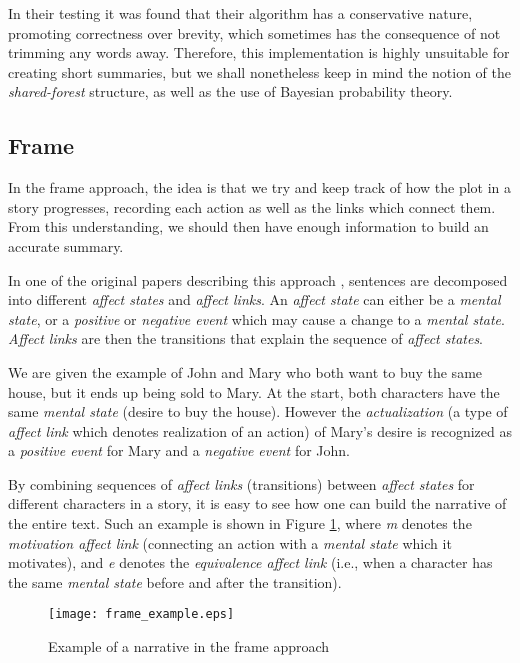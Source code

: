 In their testing it was found that their algorithm has a conservative nature, promoting correctness over brevity, which sometimes has the consequence of not trimming any words away. Therefore, this implementation is highly unsuitable for creating short summaries, but we shall nonetheless keep in mind the notion of the \textit{shared-forest} structure, as well as the use of Bayesian probability theory.

\subsection{Frame}

In the frame approach, the idea is that we try and keep track of how the plot in a story progresses, recording each action as well as the links which connect them. From this understanding, we should then have enough information to build an accurate summary.

\mbox{}

In one of the original papers describing this approach \cite{lehnert_1980_nodate}, sentences are decomposed into different \textit{affect states} and \textit{affect links}. An \textit{affect state} can either be a \textit{mental state}, or a \textit{positive} or \textit{negative event} which may cause a change to a \textit{mental state}. \textit{Affect links} are then the transitions that explain the sequence of \textit{affect states}.

We are given the example of John and Mary who both want to buy the same house, but it ends up being sold to Mary. At the start, both characters have the same \textit{mental state} (desire to buy the house). However the \textit{actualization} (a type of \textit{affect link} which denotes realization of an action) of Mary's desire is recognized as a \textit{positive event} for Mary and a \textit{negative event} for John.

By combining sequences of \textit{affect links} (transitions) between \textit{affect states} for different characters in a story, it is easy to see how one can build the narrative of the entire text. Such an example is shown in Figure \ref{fig:frame_example}, where \textit{m} denotes the \textit{motivation affect link} (connecting an action with a \textit{mental state} which it motivates), and \textit{e} denotes the \textit{equivalence affect link} (i.e., when a character has the same \textit{mental state} before and after the transition).

\begin{figure}[H]
\centering
\texttt{[image: frame\_example.eps]}
\caption{Example of a narrative in the frame approach}
\label{fig:frame_example}
\end{figure}

